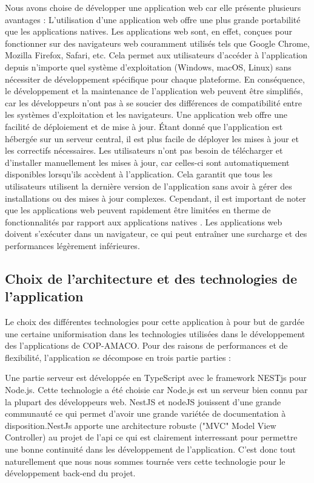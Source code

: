 \documentclass[12pt]{article}
\begin{document}
Nous avons choise de développer une  application web car elle présente plusieurs avantages :
\justify
\text L'utilisation d'une application web offre une plus grande portabilité que les applications natives. Les applications web sont, en effet, conçues pour fonctionner sur des navigateurs web couramment utilisés tels que Google Chrome, Mozilla Firefox, Safari, etc. Cela permet aux utilisateurs d'accéder à l'application depuis n'importe quel système d'exploitation (Windows, macOS, Linux) sans nécessiter de développement spécifique pour chaque plateforme. En conséquence, le développement et la maintenance de l'application web peuvent être simplifiés, car les développeurs n'ont pas à se soucier des différences de compatibilité entre les systèmes d'exploitation et les navigateurs.
\justify
\text Une application web offre une facilité de déploiement et de mise à jour. Étant donné que l'application est hébergée sur un serveur central, il est plus facile de déployer les mises à jour et les correctifs nécessaires. Les utilisateurs n'ont pas besoin de télécharger et d'installer manuellement les mises à jour, car celles-ci sont automatiquement disponibles lorsqu'ils accèdent à l'application. Cela garantit que tous les utilisateurs utilisent la dernière version de l'application sans avoir à gérer des installations ou des mises à jour complexes.
\justify
\text Cependant, il est important de noter que les applications web peuvent rapidement être limitées en therme de fonctionnalités par rapport aux applications natives . Les applications web doivent s'exécuter dans un navigateur, ce qui peut entraîner une surcharge et des performances légèrement inférieures.

\subsection{Choix de l'architecture et des technologies de l'application}

\justify
\text Le choix des différentes technologies pour cette application à pour but de gardée une certaine uniformisation dans les technologies utilisées dans le développement des l'applications de COP-AMACO.
\justify
\text Pour des raisons de performances et de flexibilité, l'application se décompose en trois partie parties :

\justify
\text Une partie serveur est développée en TypeScript avec le framework NESTjs pour Node.js. Cette technologie a été choisie car Node.js est un serveur bien connu par la plupart des développeurs web. NestJS et nodeJS jouissent d'une grande communauté ce qui permet d'avoir une grande variétée de documentation à disposition.NestJs apporte une architecture robuste ("MVC" Model View Controller) au projet de l'api ce qui est clairement interressant pour permettre une bonne continuité dans les développement de l'application. C'est donc tout naturellement que nous nous sommes tournée vers cette technologie pour le développement back-end du projet. 
\end{document}
